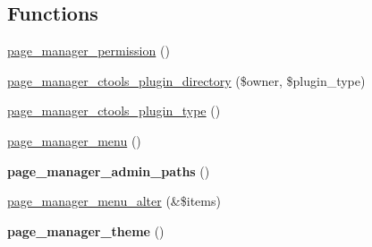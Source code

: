 \subsection*{Functions}
\begin{DoxyCompactItemize}
\item 
\hyperlink{page__manager_8module_a520d2afb3f70e8335e226e9e9c202493}{page\_\-manager\_\-permission} ()
\item 
\hyperlink{page__manager_8module_a5e41f5889b975464f474f3af5039dd4c}{page\_\-manager\_\-ctools\_\-plugin\_\-directory} (\$owner, \$plugin\_\-type)
\item 
\hyperlink{page__manager_8module_a470533a07989fa3abd6ea7eb6a18c065}{page\_\-manager\_\-ctools\_\-plugin\_\-type} ()
\item 
\hyperlink{page__manager_8module_a64d2119bb7c032cf8d11b0431a7b4bc0}{page\_\-manager\_\-menu} ()
\item 
\hypertarget{page__manager_8module_a2bb725d16d5e80ea417b2f528304ace6}{
{\bfseries page\_\-manager\_\-admin\_\-paths} ()}
\label{page__manager_8module_a2bb725d16d5e80ea417b2f528304ace6}

\item 
\hyperlink{page__manager_8module_a16da3e1f83cf82d7d13d81847206f135}{page\_\-manager\_\-menu\_\-alter} (\&\$items)
\item 
\hypertarget{page__manager_8module_ac601455bf712b4d4d38fa6b7ca033db3}{
{\bfseries page\_\-manager\_\-theme} ()}
\label{page__manager_8module_ac601455bf712b4d4d38fa6b7ca033db3}


\end{DoxyCompactItemize}
